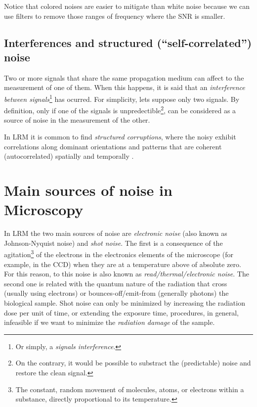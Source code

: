 Notice that colored noises are easier to mitigate than white noise
because we can use filters to remove those ranges of frequency where
the \gls{SNR} is smaller.


\subsection{Interferences and structured  (``self-correlated'') noise}

Two or more signals that share the same propagation medium can affect
to the measurement of one of them. When this happens, it is said that
an \emph{interference between signals}\footnote{Or simply, a
\emph{signals interference}.} has ocurred. For simplicity, lets
suppose only two signals. By definition, only if one of the signals is
unpredectible\footnote{On the contrary, it would be possible to
substract the (predictable) noise and restore the clean signal.}, can
be considered as a source of noise in the measurement of the other.

In \gls{LRM} it is common to find \emph{structured corruptions}, where
the noisy exhibit correlations along dominant orientations and
patterns that are coherent (autocorrelated) spatially and temporally
\cite{wang2025median2median}. %



\section{Main sources of noise in Microscopy}

In \gls{LRM} the two main sources of noise are \emph{electronic noise}
(also known as Johnson-Nyquist noise) and \emph{shot noise}. The first
is a consequence of the agitation\footnote{The constant, random
movement of molecules, atoms, or electrons within a substance,
directly proportional to its temperature.} of the electrons in the
electronics elements of the microscope (for example, in the \gls{CCD})
when they are at a temperature above of absolute zero. For this
reason, to this noise is also known as \emph{read/thermal/electronic
noise}. The second one is related with the quantum nature of the
radiation that cross (usually using electrons) or
bounces-off/emit-from (generally photons) the biological sample. Shot
noise can only be minimized by increasing the radiation dose per unit
of time, or extending the exposure time, procedures, in general,
infeasible if we want to minimize the \emph{radiation damage} of the
sample.

